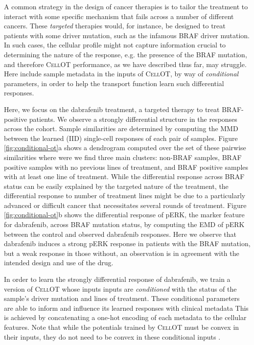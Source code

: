 A common strategy in the design of cancer therapies is to tailor the treatment to interact with some specific mechanism that fails across a number of different cancers.
These \emph{targeted} therapies would, for instance, be designed to treat patients with some driver mutation, such as the infamous BRAF driver mutation.
In such cases, the cellular profile might not capture information crucial to determining the nature of the response, e.g. the presence of the BRAF mutation,
and therefore \textsc{CellOT} performance, as we have described thus far, may struggle.
Here include sample metadata in the inputs of \textsc{CellOT}, by way of \emph{conditional} parameters, in order to help the transport function learn such differential responses.

Here, we focus on the dabrafenib treatment, a targeted therapy to treat BRAF-positive patients.
We observe a strongly differential structure in the responses across the cohort.
Sample similarities are determined by computing the MMD between the learned (IID) single-cell responses of each pair of samples.
Figure \ref{fig:conditional-ot}a shows a dendrogram computed over the set of these pairwise similarities where were we find three main clusters: non-BRAF samples, BRAF positive samples with no previous lines of treatment, and BRAF positive samples with at least one line of treatment.
While the differential response across BRAF status can be easily explained by the targeted nature of the treatment, the differential response to number of treatment lines might be due to a particularly advanced or difficult cancer that necessitates several rounds of treatment.
Figure \ref{fig:conditional-ot}b shows the differential response of pERK, the marker feature for dabrafenib, across BRAF mutation status, by computing the EMD of pERK between the control and observed dabrafenib responses.
Here we observe that dabrafenib induces a strong pERK response in patients with the BRAF mutation, but a weak response in those without,
an observation is in agreement with the intended design and use of the drug.

In order to learn the strongly differential response of dabrafenib,
we train a version of \textsc{CellOT} whose inputs inputs are \emph{conditioned} \cite{bunne2022} with the status of the sample's driver mutation and lines of treatment. 
These conditional parameters are able to inform and influence its learned responses with clinical metadata
This is achieved by concatenating a one-hot encoding of each metadata to the cellular features.
Note that while the potentials trained by \textsc{CellOT} must be convex in their inputs,
they do not need to be convex in these conditional inputs \cite{amos2017}.

